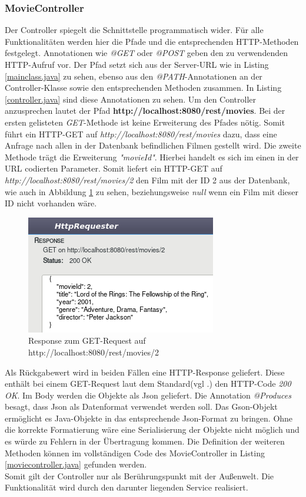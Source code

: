 \documentclass[fleqn,10.5pt,ngerman]{SelfArx}
\begin{document}
\subsubsection{MovieController}
Der Controller spiegelt die Schnittstelle programmatisch wider. Für alle Funktionalitäten werden hier die Pfade und die entsprechenden HTTP-Methoden festgelegt. Annotationen wie \textit{@GET} oder \textit{@POST} geben den zu verwendenden HTTP-Aufruf vor. Der Pfad setzt sich aus der Server-URL wie in Listing \ref{mainclass.java} zu sehen, ebenso aus den \textit{@PATH}-Annotationen an der Controller-Klasse sowie den entsprechenden Methoden zusammen. In Listing \ref{controller.java} sind diese Annotationen zu sehen. Um den Controller anzusprechen lautet der Pfad \textbf{http://localhost:8080/rest/movies}. Bei der ersten gelisteten \textit{GET}-Methode ist keine Erweiterung des Pfades nötig. Somit führt ein HTTP-GET auf \textit{http://localhost:8080/rest/movies} dazu, dass eine Anfrage nach allen in der Datenbank befindlichen Filmen gestellt wird. Die zweite Methode trägt die Erweiterung \textit{"movieId"}. Hierbei handelt es sich im einen in der URL codierten Parameter.  Somit liefert ein HTTP-GET auf \textit{http://localhost:8080/rest/movies/2} den Film mit der ID 2 aus der Datenbank, wie auch in Abbildung \ref{fig:responsebrowser} zu sehen, beziehungsweise \textit{null} wenn ein Film mit dieser ID nicht vorhanden wäre. 
\begin{figure}[ht]\centering
	\includegraphics[width=8.5 cm]{Abbildungen/getid2.jpg}
	\caption{Response zum GET-Request auf http://localhost:8080/rest/movies/2}
	\label{fig:responsebrowser}
\end{figure}

Als Rückgabewert wird in beiden Fällen eine HTTP-Response geliefert. Diese enthält bei einem GET-Request laut dem Standard(vgl .\cite{httpcodes}) den HTTP-Code \textit{200 OK}. Im Body werden die Objekte als Json geliefert. Die Annotation \textit{@Produces} besagt, dass Json als Datenformat verwendet werden soll. Das Gson-Objekt ermöglicht es Java-Objekte in das entsprechende Json-Format zu bringen. Ohne die korrekte Formatierung wäre eine Serialisierung der Objekte nicht möglich und es würde zu Fehlern in der Übertragung kommen. Die Definition der weiteren Methoden können im vollständigen Code des MovieController in Listing \ref{moviecontroller.java} gefunden werden. \\ Somit gilt der Controller nur als Berührungspunkt mit der Außenwelt. Die Funktionalität wird durch den darunter liegenden Service realisiert.
\end{document}
